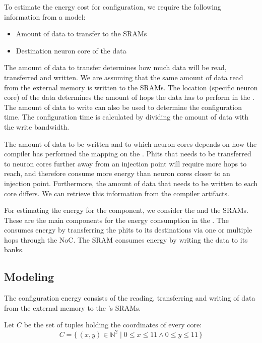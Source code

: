 To estimate the energy cost for configuration, we require the following information from a model:
\begin{itemize}
    \item Amount of data to transfer to the SRAMs
    \item Destination neuron core of the data
\end{itemize}

The amount of data to transfer determines how much data will be read, transferred and written.
We are assuming that the same amount of data read from the external memory is written to the SRAMs.
The location (specific neuron core) of the data determines the amount of hops the data has to perform in the \confignoc{}.
The amount of data to write can also be used to determine the configuration time.
The configuration time is calculated by dividing the amount of data with the write bandwidth.

The amount of data to be written and to which neuron cores depends on how the compiler has performed the mapping on the \graicore{}. %
Phits that needs to be transferred to neuron cores further away from an injection point will require more hops to reach, and therefore consume more energy than neuron cores closer to an injection point.
Furthermore, the amount of data that needs to be written to each core differs.
We can retrieve this information from the compiler artifacts.

For estimating the energy for the \graicore{} component, we consider the \confignoc{} and the SRAMs.
These are the main components for the energy consumption in the \graicore{}.
The \confignoc{} consumes energy by transferring the phits to its destinations via one or multiple hops through the NoC.
The SRAM consumes energy by writing the data to its banks.

\subsection{Modeling}
The configuration energy consists of the reading, transferring and writing of data from the external memory to the \graicore{}'s SRAMs. 

Let $C$ be the set of tuples holding the coordinates of every core:
\begin{equation*}
    C = \{\,\left(x,y\right) \in \mathbb{N}^2 \mid 0 \leq x \leq 11 \wedge 0 \leq y \leq 11 \,\} 
\end{equation*}

